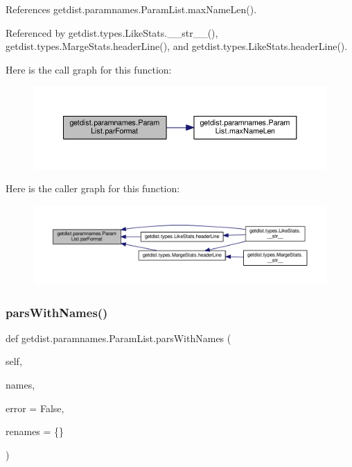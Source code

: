 References getdist.\+paramnames.\+Param\+List.\+max\+Name\+Len().



Referenced by getdist.\+types.\+Like\+Stats.\+\_\+\+\_\+str\+\_\+\+\_\+(), getdist.\+types.\+Marge\+Stats.\+header\+Line(), and getdist.\+types.\+Like\+Stats.\+header\+Line().

Here is the call graph for this function\+:
\nopagebreak
\begin{figure}[H]
\begin{center}
\leavevmode
\includegraphics[width=350pt]{classgetdist_1_1paramnames_1_1ParamList_a99b5b8568cc722be33974838ee0aefc5_cgraph}
\end{center}
\end{figure}
Here is the caller graph for this function\+:
\nopagebreak
\begin{figure}[H]
\begin{center}
\leavevmode
\includegraphics[width=350pt]{classgetdist_1_1paramnames_1_1ParamList_a99b5b8568cc722be33974838ee0aefc5_icgraph}
\end{center}
\end{figure}
\mbox{\label{classgetdist_1_1paramnames_1_1ParamList_ad267d72764306a71f58d6c051f2584b5}} 
\subsubsection{\texorpdfstring{pars\+With\+Names()}{parsWithNames()}}
{\footnotesize\ttfamily def getdist.\+paramnames.\+Param\+List.\+pars\+With\+Names (\begin{DoxyParamCaption}\item[{}]{self,  }\item[{}]{names,  }\item[{}]{error = {\ttfamily False},  }\item[{}]{renames = {\ttfamily \{\}} }\end{DoxyParamCaption})}

